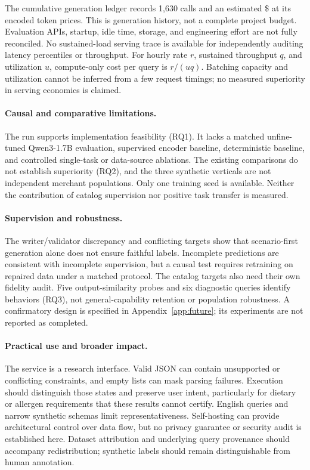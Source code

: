 \documentclass{article}
\begin{document}
The cumulative generation ledger records 1,630 calls and an estimated \$\LedgerCost{} at its encoded token prices. This is generation history, not a complete project budget. Evaluation APIs, startup, idle time, storage, and engineering effort are not fully reconciled. No sustained-load serving trace is available for independently auditing latency percentiles or throughput. For hourly rate $r$, sustained throughput $q$, and utilization $u$, compute-only cost per query is $r/(u q)$. Batching capacity and utilization cannot be inferred from a few request timings; no measured superiority in serving economics is claimed.

\paragraph{Causal and comparative limitations.}
The run supports implementation feasibility (RQ1). It lacks a matched unfine-tuned Qwen3-1.7B evaluation, supervised encoder baseline, deterministic baseline, and controlled single-task or data-source ablations. The existing comparisons do not establish superiority (RQ2), and the three synthetic verticals are not independent merchant populations. Only one training seed is available. Neither the contribution of catalog supervision nor positive task transfer is measured.

\paragraph{Supervision and robustness.}
The writer/validator discrepancy and conflicting targets show that scenario-first generation alone does not ensure faithful labels. Incomplete predictions are consistent with incomplete supervision, but a causal test requires retraining on repaired data under a matched protocol. The catalog targets also need their own fidelity audit. Five output-similarity probes and six diagnostic queries identify behaviors (RQ3), not general-capability retention or population robustness. A confirmatory design is specified in Appendix~\ref{app:future}; its experiments are not reported as completed.

\paragraph{Practical use and broader impact.}
The service is a research interface. Valid JSON can contain unsupported or conflicting constraints, and empty lists can mask parsing failures. Execution should distinguish those states and preserve user intent, particularly for dietary or allergen requirements that these results cannot certify. English queries and narrow synthetic schemas limit representativeness. Self-hosting can provide architectural control over data flow, but no privacy guarantee or security audit is established here. Dataset attribution and underlying query provenance should accompany redistribution; synthetic labels should remain distinguishable from human annotation.
\end{document}
